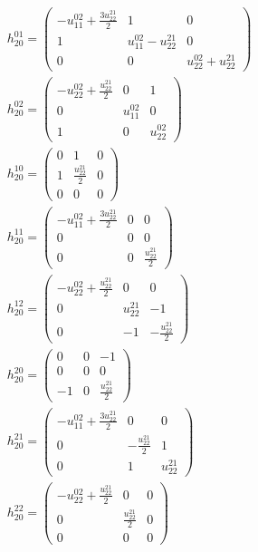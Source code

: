 \documentclass[a4paper, 11pt, twoside, onecolumn]{article}
\begin{document}
\begin{landscape}
\begin{gather*}
	 h_{20}^{01}=\begin{pmatrix}- u^{02}_{11} + \frac{3 u^{21}_{22}}{2} & 1 & 0\\1 & u^{02}_{11} - u^{21}_{22} & 0\\0 & 0 & u^{02}_{22} + u^{21}_{22}\end{pmatrix}\\ 
	 h_{20}^{02}=\begin{pmatrix}- u^{02}_{22} + \frac{u^{21}_{22}}{2} & 0 & 1\\0 & u^{02}_{11} & 0\\1 & 0 & u^{02}_{22}\end{pmatrix}\\ 
	 h_{20}^{10}=\begin{pmatrix}0 & 1 & 0\\1 & \frac{u^{21}_{22}}{2} & 0\\0 & 0 & 0\end{pmatrix}\\ 
	 h_{20}^{11}=\begin{pmatrix}- u^{02}_{11} + \frac{3 u^{21}_{22}}{2} & 0 & 0\\0 & 0 & 0\\0 & 0 & \frac{u^{21}_{22}}{2}\end{pmatrix}\\ 
	 h_{20}^{12}=\begin{pmatrix}- u^{02}_{22} + \frac{u^{21}_{22}}{2} & 0 & 0\\0 & u^{21}_{22} & -1\\0 & -1 & - \frac{u^{21}_{22}}{2}\end{pmatrix}\\ 
	 h_{20}^{20}=\begin{pmatrix}0 & 0 & -1\\0 & 0 & 0\\-1 & 0 & \frac{u^{21}_{22}}{2}\end{pmatrix}\\ 
	 h_{20}^{21}=\begin{pmatrix}- u^{02}_{11} + \frac{3 u^{21}_{22}}{2} & 0 & 0\\0 & - \frac{u^{21}_{22}}{2} & 1\\0 & 1 & u^{21}_{22}\end{pmatrix}\\ 
	 h_{20}^{22}=\begin{pmatrix}- u^{02}_{22} + \frac{u^{21}_{22}}{2} & 0 & 0\\0 & \frac{u^{21}_{22}}{2} & 0\\0 & 0 & 0\end{pmatrix}\\ 

\end{gather*}
\end{landscape}
\end{document}

